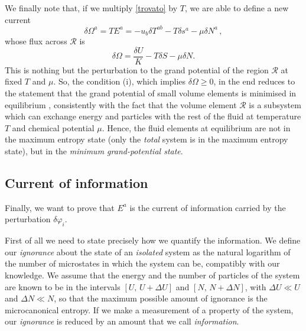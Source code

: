 \documentclass[aps,prl,reprint,nofootinbib]{revtex4-1}
\begin{document}
We finally note that, if we multiply \eqref{trovato} by $T$, we are able to define a new current
\begin{equation}
\delta \Omega^a = TE^a = -u_b \delta T^{ab} -T \delta s^a - \mu \delta N^a \, ,
\end{equation}
whose flux across $\mathcal{R}$ is
\begin{equation}
\delta \Omega = \dfrac{\delta U}{K} - T \delta S -\mu \delta N.
\end{equation}
This is nothing but the perturbation to the grand potential of the region $\mathcal{R}$ at fixed $T$ and $\mu$. So, the condition (i), which implies $\delta \Omega \geq 0$, in the end reduces to the statement that the grand potential of small volume elements is minimised in equilibrium \cite{Callen_book}, consistently with the fact that the volume element $\mathcal{R}$ is a subsystem which can exchange energy and particles with the rest of the fluid at temperature $T$ and chemical potential $\mu$. Hence, the fluid elements at equilibrium are not in the maximum entropy state (only the \textit{total} system is in the maximum entropy state), but in the \textit{minimum grand-potential state}.






\subsection{Current of information}\label{currunz}

Finally, we want to prove that $E^a$ is the current of information carried by the perturbation $\delta \varphi_i$. 

First of all we need to state precisely how we quantify the information. We define our \textit{ignorance} about the state of an \textit{isolated} system as the natural logarithm of the number of microstates in which the system can be, compatibly with our knowledge. We assume that the energy and the number of particles of the system are known to be in the intervals $[U, \, U+\Delta U]$ and $[N, \, N+\Delta N]$, with $\Delta U \ll U$ and $\Delta N \ll N$, so that the maximum possible amount of ignorance is the microcanonical entropy. If we make a measurement of a property of the system, our \textit{ignorance} is reduced by an amount that we call \textit{information}.
\end{document}
